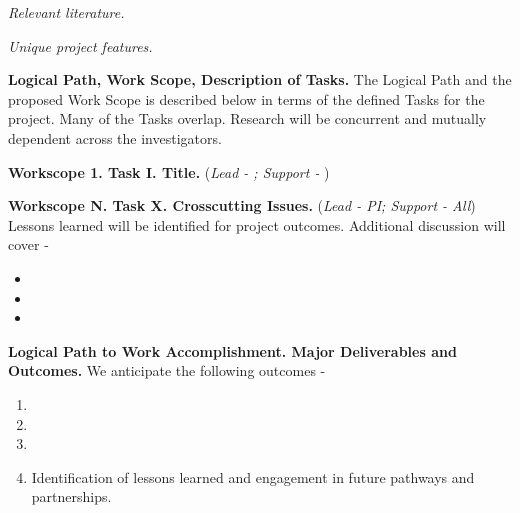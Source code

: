 \documentclass[11pt,letterpaper]{article}
\begin{document}
\textit{Relevant literature.} 

\textit{Unique project features.} 

\vspace{0.5\baselineskip}

\noindent\textbf{Logical Path, Work Scope, Description of Tasks.} The Logical Path and the proposed Work Scope is described below in terms of the defined Tasks for the project. Many of the Tasks overlap. Research will be concurrent and mutually dependent across the investigators.

\vspace{0.25\baselineskip}

\noindent\textbf{Workscope 1. Task I. Title.} (\textit{Lead - ; Support - }) 

\vspace{0.25\baselineskip}

\noindent\textbf{Workscope N. Task X. Crosscutting Issues.} (\textit{Lead - PI; Support - All}) Lessons learned will be identified for project outcomes. Additional discussion will cover -
\begin{itemize}[topsep=0pt,itemsep=-1ex,partopsep=1ex,parsep=1ex]
    \item
    \item
    \item
\end{itemize}

\vspace{0.5\baselineskip}

\noindent\textbf{Logical Path to Work Accomplishment. Major Deliverables and Outcomes.} We anticipate the following outcomes -
\begin{enumerate}[topsep=0pt,itemsep=-1ex,partopsep=1ex,parsep=1ex]
    \item
    \item
    \item
    \item Identification of lessons learned and engagement in future pathways and partnerships.
\end{enumerate}

\vspace{0.5\baselineskip}
\end{document}
